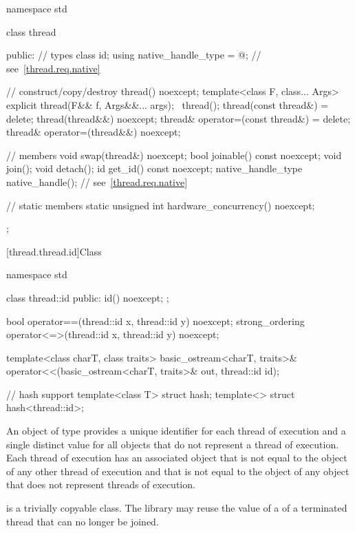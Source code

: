 %
\begin{codeblock}
namespace std {
  class thread {
  public:
    // types
    class id;
    using native_handle_type = @\impdefnc@;         // see~\ref{thread.req.native}

    // construct/copy/destroy
    thread() noexcept;
    template<class F, class... Args> explicit thread(F&& f, Args&&... args);
    ~thread();
    thread(const thread&) = delete;
    thread(thread&&) noexcept;
    thread& operator=(const thread&) = delete;
    thread& operator=(thread&&) noexcept;

    // members
    void swap(thread&) noexcept;
    bool joinable() const noexcept;
    void join();
    void detach();
    id get_id() const noexcept;
    native_handle_type native_handle();                         // see~\ref{thread.req.native}

    // static members
    static unsigned int hardware_concurrency() noexcept;
  };
}
\end{codeblock}

[thread.thread.id]{Class }

%
%
\begin{codeblock}
namespace std {
  class thread::id {
  public:
    id() noexcept;
  };

  bool operator==(thread::id x, thread::id y) noexcept;
  strong_ordering operator<=>(thread::id x, thread::id y) noexcept;

  template<class charT, class traits>
    basic_ostream<charT, traits>&
      operator<<(basic_ostream<charT, traits>& out, thread::id id);

  // hash support
  template<class T> struct hash;
  template<> struct hash<thread::id>;
}
\end{codeblock}

\pnum An object of type  provides a unique identifier for
each thread of execution and a single distinct value for all 
objects that do not represent a thread of
execution. Each thread of execution has an
associated  object that is not equal to the
 object of any other thread of execution and that is not
equal to the  object of any  object that
does not represent threads of execution.

\pnum
{} is a trivially copyable class.
The library may reuse the value of a  of a terminated thread that can no longer be joined.

